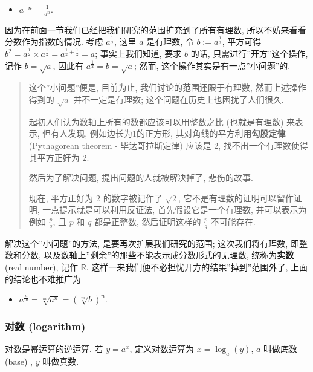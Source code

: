 \begin{itemize}
\tightlist
\item
  \(a^{-n}=\frac{1}{a^n}\).
\end{itemize}

因为在前面一节我们已经把我们研究的范围扩充到了所有有理数,
所以不妨来看看分数作为指数的情况. 考虑 \(a^{\frac{1}{2}}\), 这里 \(a\)
是有理数, 令 \(b:=a^{\frac{1}{2}}\), 平方可得
\(b^2=a^{\frac{1}{2}}\times a^{\frac{1}{2}}=a^{\frac{1}{2}+\frac{1}{2}}=a\);
事实上我们知道, 要求 \(b\) 的话, 只需进行''开方''这个操作, 记作
\(b=\sqrt{a}\), 因此有 \(a^{\frac{1}{2}}=b=\sqrt{a}\); 然而,
这个操作其实是有一点''小问题''的.

\begin{quote}
这个''小问题''便是, 目前为止, 我们讨论的范围还限于有理数,
然而上述操作得到的 \(\sqrt{a}\) 并不一定是有理数;
这个问题在历史上也困扰了人们很久.

起初人们认为数轴上所有的数都应该可以用整数之比 (也就是有理数) 来表示,
但有人发现, 例如边长为1的正方形, 其对角线的平方利用\textbf{勾股定律}
(Pythagorean theorem - 毕达哥拉斯定律) 应该是 \(2\),
找不出一个有理数使得其平方正好为 \(2\).

然后为了解决问题, 提出问题的人就被解决掉了, 悲伤的故事.

现在, 平方正好为 \(2\) 的数字被记作了 \(\sqrt{2}\),
它不是有理数的证明可以留作证明, 一点提示就是可以利用反证法,
首先假设它是一个有理数, 并可以表示为例如 \(\frac{p}{q}\), 且 \(p\) 和
\(q\) 都是正整数, 然后证明这样的 \(\frac{p}{q}\) 不可能存在.
\end{quote}

解决这个''小问题''的方法, 是要再次扩展我们研究的范围; 这次我们将有理数,
即整数和分数, 以及数轴上''剩余''的那些不能表示成分数形式的无理数,
统称为\textbf{实数} (real number), 记作 \(\mathbb{R}\).
这样一来我们便不必担忧开方的结果''掉到''范围外了, 上面的结论也不难推广为

\begin{itemize}
\tightlist
\item
  \(a^{\frac{n}{m}}=\sqrt[m]{a^n}=(\sqrt[m]{b})^n\).
\end{itemize}

\hypertarget{ux5bf9ux6570-logarithm}{%
\subsubsection{对数 (logarithm)}\label{ux5bf9ux6570-logarithm}}

对数是幂运算的逆运算. 若 \(y=a^x\), 定义对数运算为 \(x=\log_a(y)\),
\(a\) 叫做底数 (base) , \(y\) 叫做真数.

